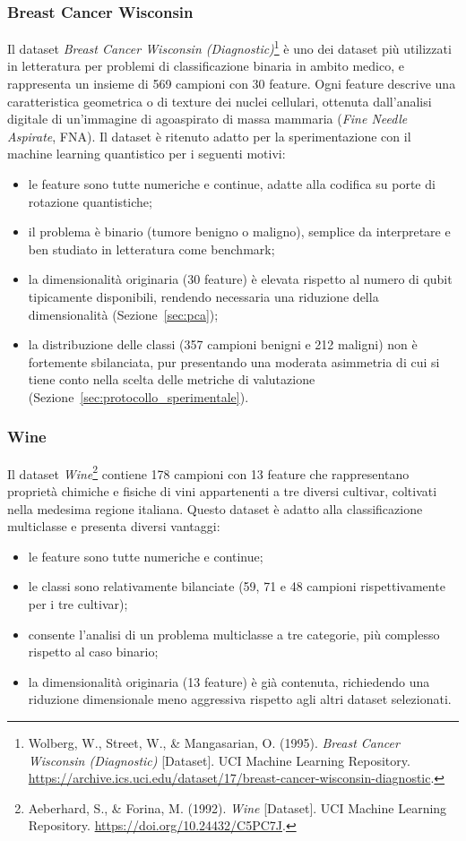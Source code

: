 \subsubsection{Breast Cancer Wisconsin}
Il dataset \textit{Breast Cancer Wisconsin (Diagnostic)}\footnote{Wolberg, W., Street, W., \& Mangasarian, O. (1995). \textit{Breast Cancer Wisconsin (Diagnostic)} [Dataset]. UCI Machine Learning Repository. \url{https://archive.ics.uci.edu/dataset/17/breast-cancer-wisconsin-diagnostic}.} è uno dei dataset più utilizzati in letteratura per problemi di classificazione binaria in ambito medico, e rappresenta un insieme di 569 campioni con 30 feature. Ogni feature descrive una caratteristica geometrica o di texture dei nuclei cellulari, ottenuta dall'analisi digitale di un'immagine di agoaspirato di massa mammaria (\textit{Fine Needle Aspirate}, FNA). Il dataset è ritenuto adatto per la sperimentazione con il machine learning quantistico per i seguenti motivi:
\begin{itemize}
    \item le feature sono tutte numeriche e continue, adatte alla codifica su porte di rotazione quantistiche;
    \item il problema è binario (tumore benigno o maligno), semplice da interpretare e ben studiato in letteratura come benchmark;
    \item la dimensionalità originaria (30 feature) è elevata rispetto al numero di qubit tipicamente disponibili, rendendo necessaria una riduzione della dimensionalità (Sezione~\ref{sec:pca});
    \item la distribuzione delle classi (357 campioni benigni e 212 maligni) non è fortemente sbilanciata, pur presentando una moderata asimmetria di cui si tiene conto nella scelta delle metriche di valutazione (Sezione~\ref{sec:protocollo_sperimentale}).
\end{itemize}

\subsubsection{Wine}
Il dataset \textit{Wine}\footnote{Aeberhard, S., \& Forina, M. (1992). \textit{Wine} [Dataset]. UCI Machine Learning Repository. \url{https://doi.org/10.24432/C5PC7J}.} contiene 178 campioni con 13 feature che rappresentano proprietà chimiche e fisiche di vini appartenenti a tre diversi cultivar, coltivati nella medesima regione italiana. Questo dataset è adatto alla classificazione multiclasse e presenta diversi vantaggi:
\begin{itemize}
    \item le feature sono tutte numeriche e continue;
    \item le classi sono relativamente bilanciate (59, 71 e 48 campioni rispettivamente per i tre cultivar);
    \item consente l'analisi di un problema multiclasse a tre categorie, più complesso rispetto al caso binario;
    \item la dimensionalità originaria (13 feature) è già contenuta, richiedendo una riduzione dimensionale meno aggressiva rispetto agli altri dataset selezionati.
\end{itemize}

